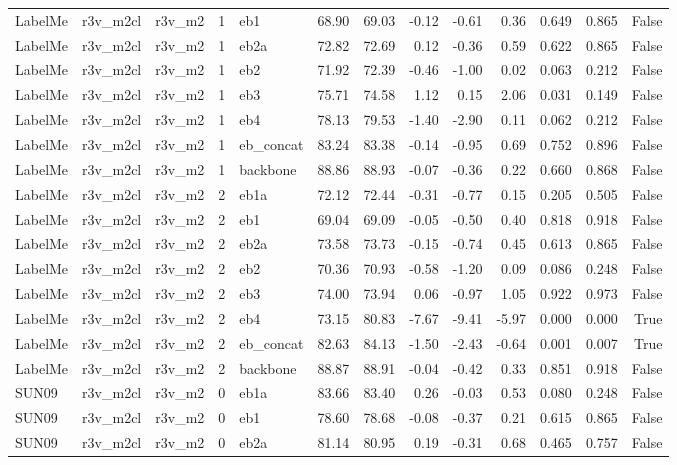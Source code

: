 \begin{table}
\begin{tabular}{lllrlrrrrrllr}
LabelMe & r3v\_m2cl & r3v\_m2 & 1 & eb1 & 68.90 & 69.03 & -0.12 & -0.61 & 0.36 & 0.649 & 0.865 & False \\
LabelMe & r3v\_m2cl & r3v\_m2 & 1 & eb2a & 72.82 & 72.69 & 0.12 & -0.36 & 0.59 & 0.622 & 0.865 & False \\
LabelMe & r3v\_m2cl & r3v\_m2 & 1 & eb2 & 71.92 & 72.39 & -0.46 & -1.00 & 0.02 & 0.063 & 0.212 & False \\
LabelMe & r3v\_m2cl & r3v\_m2 & 1 & eb3 & 75.71 & 74.58 & 1.12 & 0.15 & 2.06 & 0.031 & 0.149 & False \\
LabelMe & r3v\_m2cl & r3v\_m2 & 1 & eb4 & 78.13 & 79.53 & -1.40 & -2.90 & 0.11 & 0.062 & 0.212 & False \\
LabelMe & r3v\_m2cl & r3v\_m2 & 1 & eb\_concat & 83.24 & 83.38 & -0.14 & -0.95 & 0.69 & 0.752 & 0.896 & False \\
LabelMe & r3v\_m2cl & r3v\_m2 & 1 & backbone & 88.86 & 88.93 & -0.07 & -0.36 & 0.22 & 0.660 & 0.868 & False \\
LabelMe & r3v\_m2cl & r3v\_m2 & 2 & eb1a & 72.12 & 72.44 & -0.31 & -0.77 & 0.15 & 0.205 & 0.505 & False \\
LabelMe & r3v\_m2cl & r3v\_m2 & 2 & eb1 & 69.04 & 69.09 & -0.05 & -0.50 & 0.40 & 0.818 & 0.918 & False \\
LabelMe & r3v\_m2cl & r3v\_m2 & 2 & eb2a & 73.58 & 73.73 & -0.15 & -0.74 & 0.45 & 0.613 & 0.865 & False \\
LabelMe & r3v\_m2cl & r3v\_m2 & 2 & eb2 & 70.36 & 70.93 & -0.58 & -1.20 & 0.09 & 0.086 & 0.248 & False \\
LabelMe & r3v\_m2cl & r3v\_m2 & 2 & eb3 & 74.00 & 73.94 & 0.06 & -0.97 & 1.05 & 0.922 & 0.973 & False \\
LabelMe & r3v\_m2cl & r3v\_m2 & 2 & eb4 & 73.15 & 80.83 & -7.67 & -9.41 & -5.97 & 0.000 & 0.000 & True \\
LabelMe & r3v\_m2cl & r3v\_m2 & 2 & eb\_concat & 82.63 & 84.13 & -1.50 & -2.43 & -0.64 & 0.001 & 0.007 & True \\
LabelMe & r3v\_m2cl & r3v\_m2 & 2 & backbone & 88.87 & 88.91 & -0.04 & -0.42 & 0.33 & 0.851 & 0.918 & False \\
SUN09 & r3v\_m2cl & r3v\_m2 & 0 & eb1a & 83.66 & 83.40 & 0.26 & -0.03 & 0.53 & 0.080 & 0.248 & False \\
SUN09 & r3v\_m2cl & r3v\_m2 & 0 & eb1 & 78.60 & 78.68 & -0.08 & -0.37 & 0.21 & 0.615 & 0.865 & False \\
SUN09 & r3v\_m2cl & r3v\_m2 & 0 & eb2a & 81.14 & 80.95 & 0.19 & -0.31 & 0.68 & 0.465 & 0.757 & False \\

\end{tabular}
\end{table}
